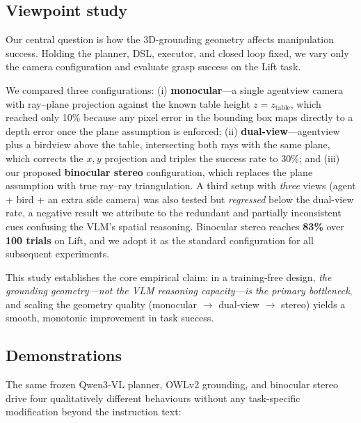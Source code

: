 \documentclass[conference]{IEEEtran}
\providecommand{\alert}[1]{\textbf{\textcolor{accent2}{#1}}}
\begin{document}
\subsection{Viewpoint study}
\label{sec:results-views}

Our central question is how the 3D-grounding geometry affects manipulation success. Holding the planner, DSL, executor, and closed loop fixed, we vary only the camera configuration and evaluate grasp success on the Lift task.

We compared three configurations: (i) \textbf{monocular}---a single agentview camera with ray--plane projection against the known table height $z=z_\text{table}$, which reached only 10\% because any pixel error in the bounding box maps directly to a depth error once the plane assumption is enforced; (ii) \textbf{dual-view}---agentview plus a birdview above the table, intersecting both rays with the same plane, which corrects the $x,y$ projection and triples the success rate to 30\%; and (iii) our proposed \textbf{binocular stereo} configuration, which replaces the plane assumption with true ray--ray triangulation. A third setup with \emph{three} views (agent + bird + an extra side camera) was also tested but \emph{regressed} below the dual-view rate, a negative result we attribute to the redundant and partially inconsistent cues confusing the VLM's spatial reasoning. Binocular stereo reaches \alert{\textbf{83\%}} over \alert{100 trials} on Lift, and we adopt it as the standard configuration for all subsequent experiments.

This study establishes the core empirical claim: in a training-free design, \emph{the grounding geometry---not the VLM reasoning capacity---is the primary bottleneck}, and scaling the geometry quality (monocular $\to$ dual-view $\to$ stereo) yields a smooth, monotonic improvement in task success.

\subsection{Demonstrations}
\label{sec:demos}

The same frozen Qwen3-VL planner, OWLv2 grounding, and binocular stereo drive four qualitatively different behaviours without any task-specific modification beyond the instruction text:
\end{document}
